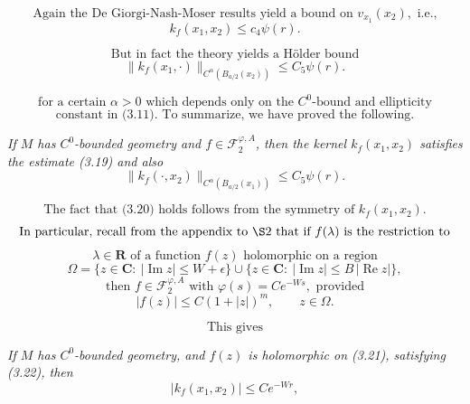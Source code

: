 \[
\text{Again the De Giorgi-Nash-Moser results yield a bound on }v_{x_1}(x_2),\text{ i.e.,}
\]
\begin{equation}\tag{3.18}
 k_f(x_1,x_2)\le c_4\psi(r).
\end{equation}

\[
\text{But in fact the theory yields a Hölder bound}
\]
\begin{equation}\tag{3.19}
 \bigl\|k_f(x_1,\cdot)\bigr\|_{C^\alpha(B_{a/2}(x_2))}\le C_5\psi(r).
\end{equation}

\[
\text{for a certain }\alpha>0\text{ which depends only on the }C^0\text{-bound and ellipticity}
\]
\[
\text{constant in (3.11). To summarize, we have proved the following.}
\]

\begin{theorem}
\label{thm:c0-bounded-geometry-kernel-estimates}


\textit{If $M$ has $C^0$-bounded geometry and $f\in \mathcal{F}_2^{\varphi,A}$, then the kernel $k_f(x_1,x_2)$ satisfies the estimate (3.19) and also}
\begin{equation}\tag{3.20}
 \bigl\|k_f(\cdot,x_2)\bigr\|_{C^\alpha(B_{a/2}(x_1))}\le C_5\psi(r).
\end{equation}
\end{theorem}

\[
\text{The fact that (3.20) holds follows from the symmetry of }k_f(x_1,x_2).
\]
\[
\text{In particular, recall from the appendix to \S2 that if }f(\lambda)\text{ is the restriction to}
\]
\[
\lambda\in\mathbf{R}\text{ of a function }f(z)\text{ holomorphic on a region}
\]
\begin{equation}\tag{3.21}
 \Omega=\{z\in \mathbf{C}:\ |\operatorname{Im}z|\le W+\epsilon\}\cup\{z\in \mathbf{C}:\ |\operatorname{Im}z|\le B\,|\operatorname{Re}z|\},
\end{equation}
\[
\text{then }f\in \mathcal{F}_2^{\varphi,A}\text{ with }\varphi(s)=Ce^{-Ws},\text{ provided}
\]
\begin{equation}\tag{3.22}
 |f(z)|\le C(1+|z|)^m,\qquad z\in\Omega.
\end{equation}

\[
\text{This gives}
\]

\begin{corollary}
\label{cor:c0-bounded-geometry-exponential-decay}


\textit{If $M$ has $C^0$-bounded geometry, and $f(z)$ is holomorphic on (3.21), satisfying (3.22), then}
\begin{equation}\tag{3.23}
 |k_f(x_1,x_2)|\le Ce^{-Wr},
\end{equation}
\end{corollary}

